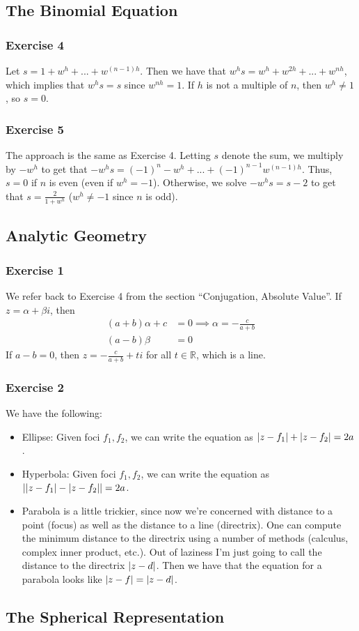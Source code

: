 \subsection{The Binomial Equation}

\subsubsection{Exercise 4}
Let $s = 1 + w^h + ... + w^{(n - 1)h}$. Then we have that $w^h s = w^h + w^{2h} + ... + w^{nh}$, which implies
that $w^h s = s$ since $w^{nh} = 1$. If $h$ is not a multiple of $n$, then $w^h \neq 1$, so $s = 0$.

\subsubsection{Exercise 5}
The approach is the same as Exercise 4. Letting $s$ denote the sum, we multiply by $-w^h$ to get that
$-w^h s = (-1)^n - w^h + ... + (-1)^{n - 1} w^{(n - 1)h}$. Thus, $s = 0$ if $n$ is even (even if $w^h = -1$).
Otherwise, we solve $-w^h s = s - 2$ to get that $s = \frac{2}{1 + w^h}$ ($w^h \neq -1$ since $n$ is odd).

\subsection{Analytic Geometry}

\subsubsection{Exercise 1}
We refer back to Exercise 4 from the section ``Conjugation, Absolute Value''. If $z = \alpha + \beta i$, then
\begin{align*}
        (a + b) \alpha + c &= 0 \implies \alpha = -\frac{c}{a + b}\\
        (a - b) \beta &= 0
\end{align*}
If $a - b = 0$, then $z = -\frac{c}{a + b} + ti$ for all $t \in \mathbb{R}$, which is a line.

\subsubsection{Exercise 2}
We have the following:
\begin{itemize}
        \item Ellipse: Given foci $f_1, f_2$, we can write the equation as $\abs{z - f_1} + \abs{z - f_2} = 2a$.
        \item Hyperbola: Given foci $f_1, f_2$, we can write the equation as
                $\abs{\abs{z - f_1} - \abs{z - f_2}} = 2a$.
        \item Parabola is a little trickier, since now we're concerned with distance to a point (focus) as
                well as the distance to a line (directrix). One can compute the minimum distance to the
                directrix using a number of methods (calculus, complex inner product, etc.). Out of laziness
                I'm just going to call the distance to the directrix $\abs{z - d}$. Then we have that the
                equation for a parabola looks like $\abs{z - f} = \abs{z - d}$.
\end{itemize}

\subsection{The Spherical Representation}

